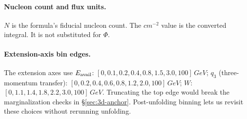 \paragraph{Nucleon count and flux units.} $N$ is the formula's fiducial nucleon count. The $\si{cm^{-2}}$ value is the converted integral. It is not substituted for $\Phi$.

\paragraph{Extension-axis bin edges.} The extension axes use $E_{\mathrm{avail}}$: $[0,0.1,0.2,0.4,0.8,1.5,3.0,100]\,\si{GeV}$; $q_{3}$ (three-momentum transfer): $[0,0.2,0.4,0.6,0.8,1.2,2.0,100]\,\si{GeV}$; $W$: $[0,1.1,1.4,1.8,2.2,3.0,100]\,\si{GeV}$. Truncating the top edge would break the marginalization checks in \S\ref{sec:3d-anchor}. Post-unfolding binning lets us revisit these choices without rerunning unfolding.

